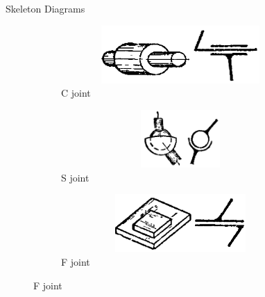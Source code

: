 \documentclass[aspectratio=169]{beamer}
\begin{document}
\begin{frame}[t]{Skeleton Diagrams}
\begin{figure}[H]
        \begin{subfigure}{0.32\textwidth}
            \centering\includegraphics[height=2.2cm,width=1\textwidth,keepaspectratio]{C_sd.png}
            \caption*{C joint}
        \end{subfigure}
        \begin{subfigure}{0.32\textwidth}
            \centering\includegraphics[height=2.2cm,width=1\textwidth,keepaspectratio]{S_sd.png}
            \caption*{S joint}
        \end{subfigure}
        \begin{subfigure}{0.32\textwidth}
            \centering\includegraphics[height=2.2cm,width=1\textwidth,keepaspectratio]{F_sd.png}
            \caption*{F joint}
        \end{subfigure}
    \end{figure}
    \end{frame}
\end{document}
